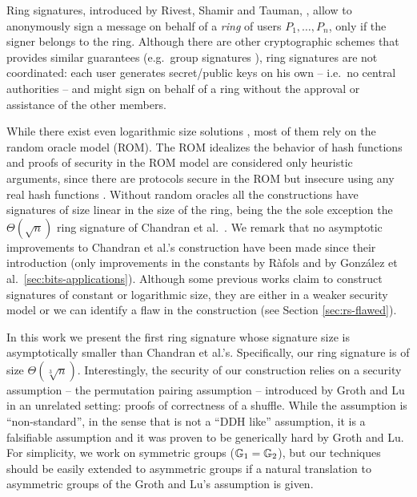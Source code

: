 Ring signatures, introduced by Rivest, Shamir and Tauman, \cite{AC:RivShaTau01}, allow to anonymously sign a message on behalf of a \emph{ring} of users $P_1,\ldots,P_n$, only if the signer belongs to the ring. Although there are other cryptographic schemes that provides similar guarantees (e.g.~group signatures \cite{EC:ChaVan91}), ring signatures are not coordinated: each user generates secret/public keys on his own -- i.e.~no central authorities -- and might sign on behalf of a ring without the approval or assistance of the other members.

While there exist even logarithmic size solutions \cite{EC:GroKoh15,EC:LLNW16}, most of them rely on the {random oracle model} (ROM). The ROM idealizes the behavior of hash functions and proofs of security in the ROM model are considered only heuristic arguments, since there are protocols secure in the ROM but insecure using any real hash functions \cite{STOC:CanGolHal98}. Without random oracles all the constructions have signatures of size linear in the size of the ring, being the the sole exception the $\Theta(\sqrt{n})$ ring signature of Chandran et al.~\cite{ICALP:ChaGroSah07}. 
We remark that no asymptotic improvements to Chandran et al.'s construction have been made since their introduction (only improvements in the constants by R\`afols \cite{TCC:Rafols15} and by Gonz\'alez et al.~\ref{sec:bits-applications}). Although some previous works claim to construct signatures of constant \cite{ACISP:BosDasRan15} or logarithmic \cite{IET:GriSusPla16} size, they are either in a weaker security model or we can identify a flaw in the construction (see Section \ref{sec:rs-flawed}). 

In this work we present the first ring signature whose signature size is asymptotically smaller than Chandran et al.'s. Specifically, our ring signature is of size $\Theta(\sqrt[3]{n})$. Interestingly, the security of our construction relies on a security assumption -- the {permutation pairing assumption} -- introduced by Groth and Lu \cite{AC:GroLu07} in an unrelated setting: proofs of correctness of a shuffle. While the assumption is ``non-standard'', in the sense that is not a ``DDH like'' assumption, it is a falsifiable assumption and it was proven to be generically hard by Groth and Lu. For simplicity, we work on symmetric groups ($\mathbb{G}_1=\mathbb{G}_2$), but our techniques should be easily extended to asymmetric groups if a natural translation to asymmetric groups of the Groth and Lu's assumption is given.

